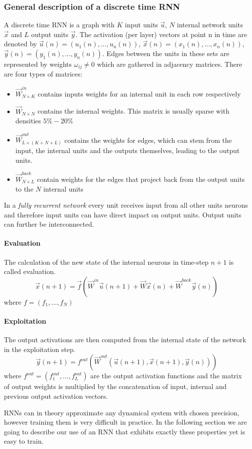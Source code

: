 \subsubsection*{General description of a discrete time RNN}
A discrete time RNN is a graph with $K$ input units $\vec{u}$, $N$ internal network units $\vec{x}$ and $L$ output units $\vec{y}$. The activation (per layer) vectors at point n in time are denoted by $\vec{u}(n) = (u_1(n),...,u_n(n))$, $\vec{x}(n) = (x_1(n),...,x_n(n))$, $\vec{y}(n) = (y_1(n),...,y_n(n))$. Edges between the units in these sets are represented by weights $\omega_{ij}\neq0$ which are gathered in adjacency matrices. There are four types of matrices:\par
\begin{itemize}
	\item $\vec{W}^{in}_{N\times K}$ contains inputs weights for an internal unit in each row respectively 
	\item $\vec{W}_{N\times N}$ contains the internal weights. This matrix is usually sparse with densities $5\%-20\%$
	\item $\vec{W}^{out}_{L\times (K+N+L)}$ contains the weights for edges, which can stem from the input, the internal units and the outputs themselves, leading to the output units.
	\item $\vec{W}^{back}_{N\times L}$ contain weights for the edges that project back from the output units to the $N$ internal units
\end{itemize}

In a \emph{fully recurrent network} every unit receives input from all other units neurons and therefore input units can have direct impact on output units. Output units can further be interconnected.\par

\paragraph{Evaluation}
The calculation of the new state of the internal neurons in time-step $n+1$ is called evaluation. 
\[
\vec{x}(n+1)=\vec{f}(\vec{W}^{in}\vec{u}(n+1)+\vec{W}\vec{x}(n)+\vec{W}^{back}\vec{y}(n))
\]
where $f=(f_1,...,f_N)$
\paragraph{Exploitation}
The output activations are then computed from the internal state of the network in the exploitation step.
\[
\vec{y}(n+1)=f^{out}(\vec{W}^{out}(\vec{u}(n+1),\vec{x}(n+1),\vec{y}(n)))
\]
where $f^{out}=(f^{out}_1,...,f^{out}_L)$ are the output activation functions and the matrix of output weights is multiplied by the concatenation of input, internal and previous output activation vectors.\par
RNNs can in theory approximate any dynamical system with chosen precision, however training them is very difficult in practice. In the following section we are going to describe our use of an RNN that exhibits exactly these properties yet is easy to train.

